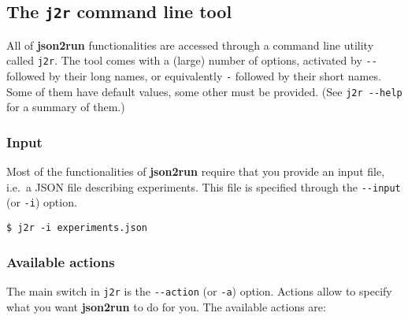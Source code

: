 \documentclass[11pt,notitlepage,twoside,a4paper]{article}
\begin{document}
\subsection{The \texttt{j2r} command line tool}

All of \textbf{json2run} functionalities are accessed through a command
line utility called \texttt{j2r}. The tool comes with a (large) number
of options, activated by \texttt{-{}-} followed by their long names, or
equivalently \texttt{-} followed by their short names. Some of them have
default values, some other must be provided. (See \texttt{j2r -{}-help}
for a summary of them.)

\subsubsection{Input}

Most of the functionalities of \textbf{json2run} require that you
provide an input file, i.e.~a JSON file describing experiments. This
file is specified through the \texttt{-{}-input} (or \texttt{-i})
option.

\begin{lstlisting}
$ j2r -i experiments.json
\end{lstlisting}

\subsubsection{Available actions}

The main switch in \texttt{j2r} is the \texttt{-{}-action} (or
\texttt{-a}) option. Actions allow to specify what you want
\textbf{json2run} to do for you. The available actions are:
\end{document}
